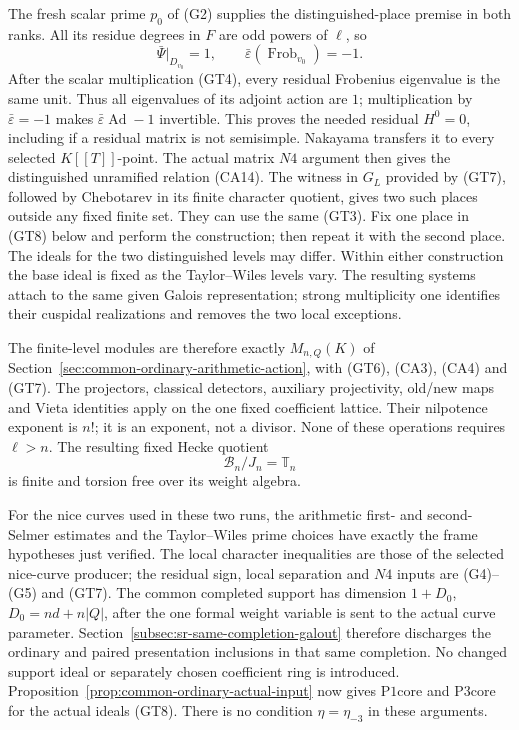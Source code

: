 The fresh scalar prime \(p_0\) of (G2) supplies
the distinguished-place premise in both ranks.
All its residue degrees in \(F\) are odd powers
of \(\ell\), so
\[
   \bar\Psi|_{D_{v_0}}=1,\qquad
              \bar\varepsilon(\operatorname{Frob}_{v_0})=-1.
 \tag{GT7}
\]
After the scalar multiplication (GT4), every
residual Frobenius eigenvalue is the same unit.
Thus all eigenvalues of its adjoint action are \(1\);
multiplication by \(\bar\varepsilon=-1\) makes
\(\bar\varepsilon\operatorname{Ad}-1\) invertible.
This proves the needed residual \(H^0=0\), including
if a residual matrix is not semisimple.
Nakayama transfers it to every selected \(K[[T]]\)-point.
The actual matrix \(N4\) argument then gives the
distinguished unramified relation (CA14).
The witness in \(G_L\) provided by (GT7), followed by
Chebotarev in its finite character quotient, gives two
such places outside any fixed finite set.
They can use the same (GT3).
Fix one place in (GT8) below and perform the construction;
then repeat it with the second place.
The ideals for the two distinguished levels may differ.
Within either construction the base ideal is fixed as
the Taylor--Wiles levels vary.
The resulting systems attach to the same given Galois
representation; strong multiplicity one identifies their
cuspidal realizations and removes the two local exceptions.

The finite-level modules are therefore exactly
\(M_{n,Q}(K)\) of
Section~\ref{sec:common-ordinary-arithmetic-action},
with (GT6), (CA3), (CA4) and (GT7).
The projectors, classical detectors, auxiliary
projectivity, old/new maps and Vieta identities apply
on the one fixed coefficient lattice.
Their nilpotence exponent is \(n!\); it is an
exponent, not a divisor.
None of these operations requires \(\ell>n\).
The resulting fixed Hecke quotient
\[
                          \mathcal B_n/J_n=\mathbb T_n
 \tag{GT8}
\]
is finite and torsion free over its weight algebra.

For the nice curves used in these two runs, the
arithmetic first- and second-Selmer estimates and the
Taylor--Wiles prime choices have exactly the frame
hypotheses just verified.
The local character inequalities are those of the
selected nice-curve producer; the residual sign,
local separation and \(N4\) inputs are (G4)--(G5)
and (GT7).
The common completed support has dimension
\(1+D_0\), \(D_0=nd+n|Q|\), after the one formal
weight variable is sent to the actual curve parameter.
Section~\ref{subsec:sr-same-completion-galout}
therefore discharges the ordinary and paired
presentation inclusions in that same completion.
No changed support ideal or separately chosen
coefficient ring is introduced.
Proposition~\ref{prop:common-ordinary-actual-input}
now gives \(\mathrm{P1core}\) and
\(\mathrm{P3core}\) for the actual ideals (GT8).
There is no condition \(\eta=\eta_{-3}\) in these
arguments.

